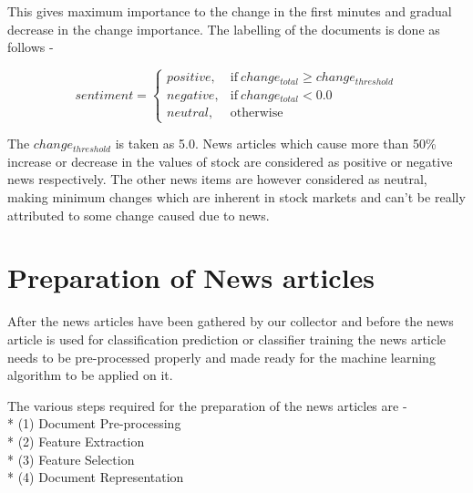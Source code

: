 \documentclass[a4paper,12bp]{report}
\begin{document}
This gives maximum importance to the change in the first minutes and gradual decrease in the change importance. The labelling of the documents is done as follows - 

\begin{equation}
sentiment=
	\begin{cases}
		positive, & \text{if}\ change_{total} \geq change_{threshold} \\
		negative, & \text{if}\ change_{total} < 0.0 \\
     	neutral, & \text{otherwise}
	\end{cases}
\end{equation}

The $change_{threshold}$ is taken as 5.0. News articles which cause more than 50\% increase or decrease in the values of stock are considered as positive or negative news respectively. The other news items are however considered as neutral, making minimum changes which are inherent in stock markets and can't be really attributed to some change caused due to news. 

\section{Preparation of News articles}
After the news articles have been gathered by our collector and before the news article is used for classification prediction or classifier training the news article needs to be pre-processed properly and made ready for the machine learning algorithm to be applied on it. 

The various steps required for the preparation of the news articles are - \\* 
(1) Document Pre-processing \\*
(2) Feature Extraction \\*
(3) Feature Selection \\*
(4) Document Representation
\end{document}

